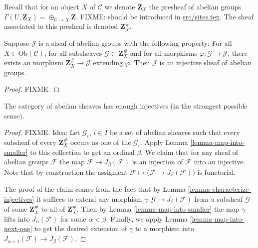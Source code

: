 \noindent
Recall that for an object $X$ of $\mathcal{C}$ we denote $\mathbf{Z}_X$ 
the presheaf of abelian groups $\Gamma(U, \mathbf{Z}_X) = 
\oplus_{U \to X} \mathbf{Z}$. FIXME: should be introduced in
\url{src/sites.tex}. The sheaf associated to this presheaf
is denoted $\mathbf{Z}_X^\#$.

\begin{lemma}
\label{lemma-characterize-injectives}
Suppose $\mathcal{J}$ is a sheaf of abelian groups with the following
property: For all $X\in \text{Ob}(\mathcal{C})$, for all subsheaves
$\mathcal{G} \subset \mathbf{Z}_X^\#$ and for all morphisms
$\varphi : \mathcal{G} \to \mathcal{J}$, there exists an morphism
$\mathbf{Z}_X^\# \to \mathcal{J}$ extending $\varphi$.
Then $\mathcal{J}$ is an injective sheaf of abelian groups.
\end{lemma}

\begin{proof}
FIXME.
\end{proof}

\begin{theorem}
\label{theorem-sheaves-injectives}
The category of abelian sheaves has enough injectives (in the
strongest possible sense).
\end{theorem}

\begin{proof}
FIXME. Idea: Let $\mathcal{G}_i$, $i\in I$ be a set of abelian
sheaves such that every subsheaf of every $\mathbf{Z}_X^\#$
occurs as one of the $\mathcal{G}_i$. Apply
Lemma \ref{lemma-map-into-smaller} to this collection to
get an ordinal $\beta$. We claim that for any sheaf of abelian
groups $\mathcal{F}$ the map $\mathcal{F} \to J_\beta(\mathcal{F})$
is an injection of $\mathcal{F}$ into an injective.
Note that by construction the assigment $\mathcal{F} \mapsto
\big(\mathcal{F} \to J_\beta(\mathcal{F})\big)$ is functorial.

\smallskip\noindent
The proof of the claim comes from the fact that by
Lemma \ref{lemma-characterize-injectives} it suffices to extend any
morphism $\gamma : \mathcal{G} \to J_\beta(\mathcal{F})$ 
from a subsheaf $\mathcal{G}$ of some $\mathbf{Z}_X^\#$ to all of
$\mathbf{Z}_X^\#$. Then by Lemma \ref{lemma-map-into-smaller} the
map $\gamma$ lifts into $J_\alpha(\mathcal{F})$ for some
$\alpha < \beta$. Finally, we apply Lemma \ref{lemma-map-into-next-one}
to get the desired extension of $\gamma$ to a morphism
into $J_{\alpha+1}(\mathcal{F}) \to J_\beta(\mathcal{F})$.
\end{proof}

